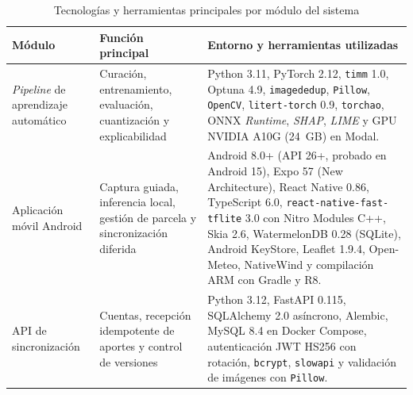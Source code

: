 \begin{table}[H]
\caption{Tecnolog\'ias y herramientas principales por m\'odulo del sistema}
\label{tab:tecnologias_c2}
\centering
\footnotesize
\begin{singlespace}
\renewcommand{\arraystretch}{1.1}
\begin{tabularx}{\textwidth}{>{\raggedright\arraybackslash}p{3.0cm}>{\raggedright\arraybackslash}p{3.6cm}X}
\toprule
\textbf{M\'odulo} & \textbf{Funci\'on principal} & \textbf{Entorno y herramientas utilizadas} \\
\midrule
\textit{Pipeline} de aprendizaje autom\'atico & Curaci\'on, entrenamiento, evaluaci\'on, cuantizaci\'on y explicabilidad & Python 3.11, PyTorch 2.12, \texttt{timm} 1.0, Optuna 4.9, \texttt{imagededup}, \texttt{Pillow}, \texttt{OpenCV}, \texttt{litert-torch} 0.9, \texttt{torchao}, ONNX \textit{Runtime}, \textit{SHAP}, \textit{LIME} y GPU NVIDIA A10G (24~GB) en Modal. \\
Aplicaci\'on m\'ovil Android & Captura guiada, inferencia local, gesti\'on de parcela y sincronizaci\'on diferida & Android 8.0+ (API 26+, probado en Android 15), Expo 57 (New Architecture), React Native 0.86, TypeScript 6.0, \texttt{react-native-fast-tflite} 3.0 con Nitro Modules C++, Skia 2.6, WatermelonDB 0.28 (SQLite), Android KeyStore, Leaflet 1.9.4, Open-Meteo, NativeWind y compilaci\'on ARM con Gradle y R8. \\
API de sincronizaci\'on & Cuentas, recepci\'on idempotente de aportes y control de versiones & Python 3.12, FastAPI 0.115, SQLAlchemy 2.0 as\'incrono, Alembic, MySQL 8.4 en Docker Compose, autenticaci\'on JWT HS256 con rotaci\'on, \texttt{bcrypt}, \texttt{slowapi} y validaci\'on de im\'agenes con \texttt{Pillow}. \\
\bottomrule
\end{tabularx}
\end{singlespace}
\end{table}

